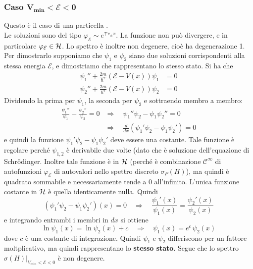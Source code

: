 \documentclass[../../FisicaTeorica.tex]{subfiles}
\begin{document}
\subsubsection{Caso $\bm{V_{\text{min}} < \mathcal{E} < 0}$}
Questo è il caso di una particella .\\
Le soluzioni sono del tipo $\varphi_\mathcal{E}\sim e^{\mp c_\pm x}$. La funzione non può divergere, e in particolare $\varphi_\mathcal{E}\in \mathcal{H}$. Lo spettro è inoltre non degenere, cioè ha degenerazione 1. Per dimostrarlo supponiamo che $\psi_1$ e $\psi_2$ siano due soluzioni corrispondenti alla stessa energia $\mathcal{E}$, e dimostriamo che rappresentano lo stesso stato. Si ha che
\begin{align*}
\psi_1'' + \frac{2m}{\hbar^2}(\mathcal{E}-V(x))\psi_1 &= 0\\[0.6em]
\psi_2'' + \frac{2m}{\hbar^2}(\mathcal{E}-V(x))\psi_2 &= 0
\end{align*}
Dividendo la prima per $\psi_1$, la seconda per $\psi_2$ e sottraendo membro a membro:
\begin{align*}
\frac{\psi_1''}{\psi_1} - \frac{\psi_2''}{\psi_2} = 0 &\Rightarrow \quad \psi_1''\psi_2 - \psi_1\psi_2'' = 0\\
& \Rightarrow \quad \frac{d}{dx}(\psi_1' \psi_2 - \psi_1 \psi_2') = 0
\end{align*}
e quindi la funzione $\psi_1'\psi_2 - \psi_1 \psi_2'$ deve essere una costante. Tale funzione è regolare perché $\psi_{1,2}$ è derivabile due volte (dato che è soluzione dell'equazione di Schr\"odinger. Inoltre tale funzione è in $\mathcal{H}$ (perché è combinazione $\mathcal{C}^\infty$ di autofunzioni $\varphi_\mathcal{E}$ di autovalori nello spettro discreto $\sigma_P(H)$), ma quindi è quadrato sommabile e necessariamente tende a 0 all'infinito. L'unica funzione costante in $\mathcal{H}$ è quella identicamente nulla. Quindi
\[
(\psi_1' \psi_2 - \psi_1 \psi_2')(x) = 0 \quad \Rightarrow \quad \frac{\psi_1'(x)}{\psi_1(x)} = \frac{\psi_2'(x)}{\psi_2(x)}
\]
e integrando entrambi i membri in $dx$ si ottiene
\[
\ln \psi_1(x) = \ln \psi_2(x) + c \quad
\Rightarrow \quad \psi_1(x) = e^{c} \, \psi_2(x)
\]
dove $c$ è una costante di integrazione. Quindi $\psi_1$ e $\psi_2$ differiscono per un fattore moltplicativo, ma quindi rappresentano lo \textbf{stesso stato}.
Segue che lo spettro  $\sigma(H)|_{V_\text{min} < \mathcal{E} < 0}$ è non degenere.
\end{document}
